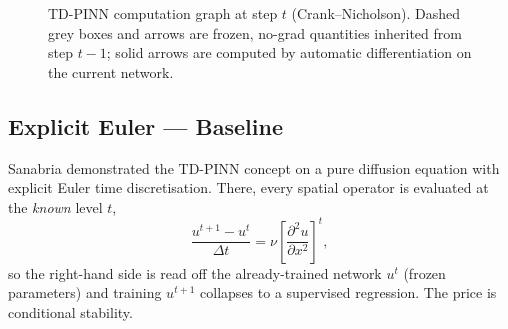 \begin{figure}[H]
{}
\caption{TD-PINN computation graph at step $t$ (Crank--Nicholson). Dashed grey
  boxes and arrows are frozen, no-grad quantities inherited from step $t{-}1$;
  solid arrows are computed by automatic differentiation on the current
  network.}
\label{fig:tdpinn_diagram}
\end{figure}

\subsection{Explicit Euler --- Baseline \texorpdfstring{\protect\citep{pipe}}{(Sanabria)}}

Sanabria \citeyear{pipe} demonstrated the TD-PINN concept on a pure diffusion
equation with explicit Euler time discretisation. There, every spatial
operator is evaluated at the \emph{known} level $t$,
\[
  \frac{u^{t+1} - u^{t}}{\Delta t}
  = \nu\left[\frac{\partial^2 u}{\partial x^2}\right]^{\!t},
\]
so the right-hand side is read off the already-trained network $u^t$ (frozen
parameters) and training $u^{t+1}$ collapses to a supervised regression. The
price is conditional stability.

